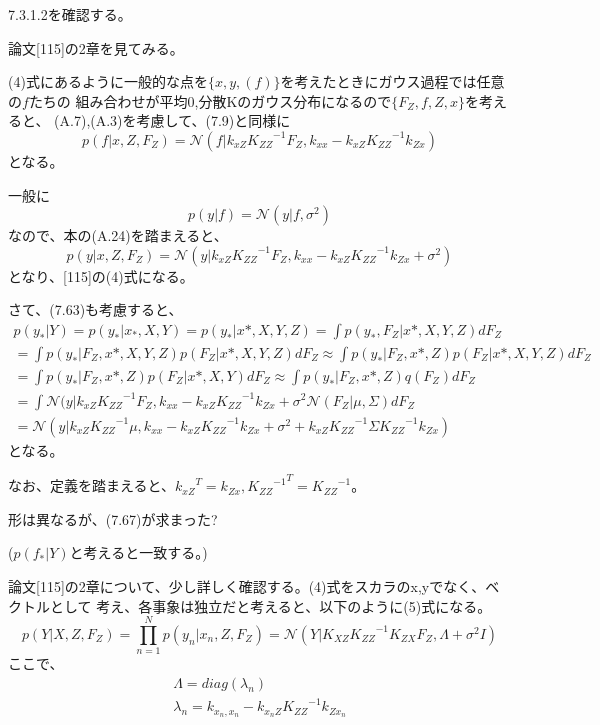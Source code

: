 ﻿\documentclass{jsarticle}
\begin{document}
7.3.1.2を確認する。

論文[115]の2章を見てみる。

(4)式にあるように一般的な点を$\{ x, y, (f) \}$を考えたときにガウス過程では任意の$f$たちの
組み合わせが平均0,分散Kのガウス分布になるので$\{ F_Z, f, Z, x \}$を考えると、
(A.7),(A.3)を考慮して、(7.9)と同様に
\begin{equation}
p(f | x, Z, F_Z) = \mathcal{N}(f | k_{xZ} {K_{ZZ}}^{-1} F_Z, k_{xx} - k_{xZ} {K_{ZZ}}^{-1} k_{Zx})
\end{equation}
となる。

一般に
\begin{equation}
p(y | f) = \mathcal{N}(y | f, \sigma^2)
\end{equation}
なので、本の(A.24)を踏まえると、
\begin{equation}
p(y | x, Z, F_Z) = \mathcal{N}(y | k_{xZ} {K_{ZZ}}^{-1} F_Z, k_{xx} - k_{xZ} {K_{ZZ}}^{-1} k_{Zx} + \sigma^2)
\end{equation}
となり、[115]の(4)式になる。

さて、(7.63)も考慮すると、
\begin{equation}
\begin{split}
p(y_* | Y) = p(y_* | x_*, X, Y) = p(y_* | x*, X, Y, Z) = \int p(y_*, F_Z | x*, X, Y, Z) dF_Z\\
= \int p(y_* | F_Z, x*, X, Y, Z) p(F_Z | x*, X, Y, Z) dF_Z 
\approx \int p(y_* | F_Z, x*, Z) p(F_Z | x*, X, Y, Z) dF_Z\\
= \int p(y_* | F_Z, x*, Z) p(F_Z | x*, X, Y) dF_Z
\approx \int p(y_* | F_Z, x*, Z) q(F_Z) dF_Z\\
= \int \mathcal{N}(y | k_{xZ} {K_{ZZ}}^{-1} F_Z, k_{xx} - k_{xZ} {K_{ZZ}}^{-1} k_{Zx} + \sigma^2 \mathcal{N}(F_Z | \mu, \Sigma)dF_Z\\
= \mathcal{N}(y | k_{xZ} {K_{ZZ}}^{-1} \mu, k_{xx} - k_{xZ} {K_{ZZ}}^{-1} k_{Zx} + \sigma^2 + k_{xZ} {K_{ZZ}}^{-1} \Sigma {K_{ZZ}}^{-1} k_{Zx})
\end{split}
\end{equation}
となる。

なお、定義を踏まえると、${k_{xZ}}^T = k_{Zx}, {{K_{ZZ}}^{-1}}^T = {K_{ZZ}}^{-1}$。

形は異なるが、(7.67)が求まった?

($p(f_* | Y)$と考えると一致する。)

論文[115]の2章について、少し詳しく確認する。(4)式をスカラのx,yでなく、ベクトルとして
考え、各事象は独立だと考えると、以下のように(5)式になる。
\begin{equation}
p(Y | X, Z, F_Z) = \prod_{n = 1}^N p(y_n | x_n, Z, F_Z) 
= \mathcal{N}(Y | K_{XZ}{K_{ZZ}}^{-1}K_{ZX} F_Z, \Lambda + \sigma^2 I)
\end{equation}
ここで、
\begin{equation}
\begin{split}
\Lambda = diag(\lambda_n)\\
\lambda_n = k_{x_n, x_n} - k_{x_n Z}{K_{ZZ}}^{-1}k_{Z x_n}
\end{split}
\end{equation}
\end{document}
